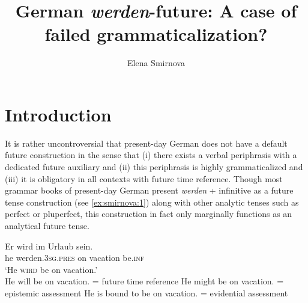 \documentclass[output=paper,colorlinks,citecolor=brown]{langscibook}
\author{Elena Smirnova\orcid{0000-0003-3763-9951}\affiliation{Université de Neuchâtel}}
\title{German \emph{werden}-future: A case of failed grammaticalization?}
\begin{document}
\maketitle


\section{Introduction}\label{sec:smirnova:1}
It is rather uncontroversial that present-day German does not have a default future construction in the sense that (i) there exists a verbal periphrasis with a dedicated future auxiliary and (ii) this periphrasis is highly grammaticalized and (iii) it is obligatory in all contexts with future time reference. Though most grammar books of present-day German present \emph{werden} + infinitive as a future tense construction (see \ref{ex:smirnova:1}) along with other analytic tenses such as perfect or pluperfect, this construction in fact only marginally functions as an analytical future tense. 

\ea \label{ex:smirnova:1}
\gll Er wird im Urlaub sein.\\
     he werden.\textsc{3sg}.\textsc{pres} on vacation be.\textsc{inf}\\
\glt `He \textsc{wird} be on vacation.'\\
    \ea \label{ex:smirnova:1a}
    He will be on vacation. = future time reference 
    \ex \label{ex:smirnova:1b}
        He might be on vacation. = epistemic assessment
    \ex \label{ex:smirnova:1c}
        He is bound to be on vacation. = evidential assessment 
    \z
\z
\end{document}
